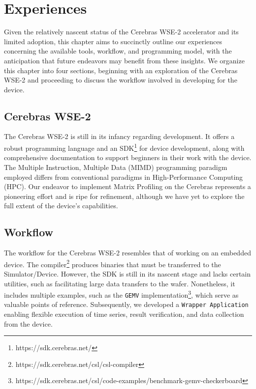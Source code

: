 \chapter{Experiences}\label{chapter:experiences}

Given the relatively nascent status of the Cerebras WSE-2 accelerator and its limited adoption, this chapter aims to succinctly outline our experiences concerning the available tools, workflow, and programming model, with the anticipation that future endeavors may benefit from these insights. We organize this chapter into four sections, beginning with an exploration of the Cerebras WSE-2 and proceeding to discuss the workflow involved in developing for the device.

\section{Cerebras WSE-2}

The Cerebras WSE-2 is still in its infancy regarding development. It offers a robust programming language and an SDK\footnote{https://sdk.cerebras.net/} for device development, along with comprehensive documentation to support beginners in their work with the device. The Multiple Instruction, Multiple Data (MIMD) programming paradigm employed differs from conventional paradigms in High-Performance Computing (HPC). Our endeavor to implement Matrix Profiling on the Cerebras represents a pioneering effort and is ripe for refinement, although we have yet to explore the full extent of the device's capabilities.

\section{Workflow}

The workflow for the Cerebras WSE-2 resembles that of working on an embedded device. The compiler\footnote{https://sdk.cerebras.net/csl/csl-compiler} produces binaries that must be transferred to the Simulator/Device. However, the SDK is still in its nascent stage and lacks certain utilities, such as facilitating large data transfers to the wafer. Nonetheless, it includes multiple examples, such as the \texttt{GEMV} implementation\footnote{https://sdk.cerebras.net/csl/code-examples/benchmark-gemv-checkerboard}, which serve as valuable points of reference. Subsequently, we developed a \texttt{Wrapper Application} enabling flexible execution of time series, result verification, and data collection from the device.

